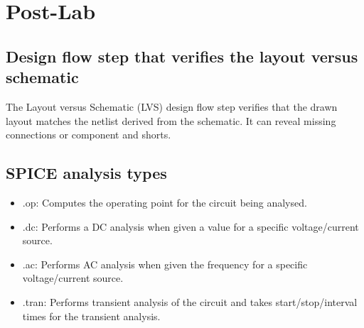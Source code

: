

\newcommand{\reffig}[1]{Fig.~\ref{#1}}



\newpage
\section{Post-Lab}
\subsection{Design flow step that verifies the layout versus schematic}
The Layout versus Schematic (LVS) design flow step verifies that the drawn layout matches the netlist derived
from the schematic. It can reveal missing connections or component and shorts. 

\subsection{SPICE analysis types}
\begin{itemize}
    \item {.op:} Computes the operating point for the circuit being analysed.
    \item {.dc:} Performs a DC analysis when given a value for a specific voltage/current source.
    \item {.ac:} Performs AC analysis when given the frequency for a specific voltage/current source.
    \item {.tran:} Performs transient analysis of the circuit and takes start/stop/interval times for
        the transient analysis.
\end{itemize}

